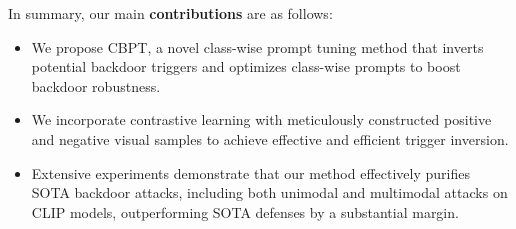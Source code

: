 In summary, our main \textbf{contributions} are as follows:
\begin{itemize}
    \item We propose CBPT, a novel class-wise prompt tuning method that inverts potential backdoor triggers and optimizes class-wise prompts to boost backdoor robustness. 
    \item We incorporate contrastive learning with meticulously constructed positive and negative visual samples to achieve effective and efficient trigger inversion.
    \item Extensive experiments demonstrate that our method effectively purifies SOTA backdoor attacks, including both unimodal and multimodal attacks on CLIP models, outperforming SOTA defenses by a substantial margin.
\end{itemize}